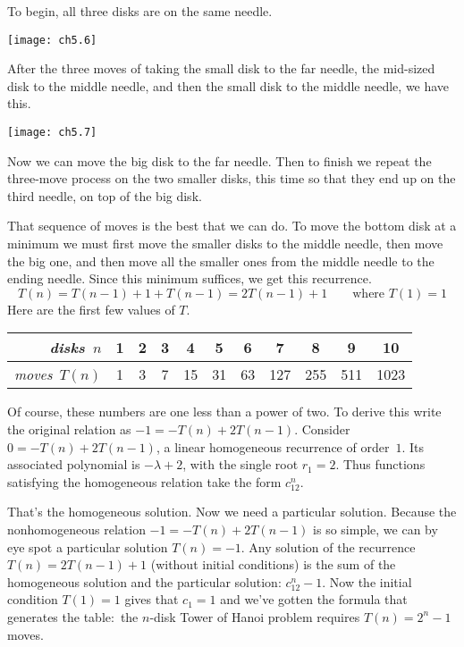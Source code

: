 To begin, all three disks are on the same needle.
\begin{center}
  \texttt{[image: ch5.6]}
\end{center}
After the three moves of taking the small disk to the far needle, 
the mid-sized disk to the
middle needle, and then the small disk to the middle needle,
we have this. 
\begin{center}
  \texttt{[image: ch5.7]}
\end{center}
Now we can  move the big disk to the far needle.
Then to finish we repeat the three-move process on the two smaller 
disks, this time so that they end up on the third needle, 
on top of the big disk.

That sequence of moves is the best that we can do.
To move the bottom disk
at a minimum we must first move the smaller disks to the middle needle, 
then move the big one,
and then move all the smaller ones from the middle needle 
to the ending needle. 
Since this minimum suffices, we get this recurrence.
\begin{equation*}
  T(n)=T(n-1)+1+T(n-1)=2T(n-1)+1 \qquad \text{where $T(1)=1$}
\end{equation*} 
Here are the first few values of $T$.
\begin{center}
  \begin{tabular}{r|cccccccccc}
    \textit{disks}~$n$             
       &1  &2  &3  &4  &5  &6     &7    &8    &9   &10  \\
    \hline
    \textit{moves}~$T(n)$ 
       &1  &3  &7  &15  &31  &63  &127  &255  &511 &1023 
  \end{tabular}
\end{center}
Of course, these numbers are one less than a power of two.
To derive this 
write the original relation as $-1=-T(n)+2T(n-1)$.
Consider $0=-T(n)+2T(n-1)$, a linear homogeneous recurrence of order~$1$. 
Its associated polynomial is $-\lambda+2$, 
with the single root $r_1=2$.
Thus
functions satisfying the homogeneous relation take the form $c_12^n$.

That's the homogeneous solution.
Now we need a particular solution. 
Because the nonhomogeneous relation $-1=-T(n)+2T(n-1)$ is so simple, 
we can by eye spot a particular solution $T(n)=-1$.
Any solution of the recurrence 
$T(n)=2T(n-1)+1$ (without initial conditions)
is the sum of the homogeneous solution and the
particular solution: $c_12^n-1$.
Now the initial condition $T(1)=1$ gives that $c_1=1$ and we've gotten
the formula that generates the table:~the $n$-disk Tower of Hanoi problem 
requires $T(n)=2^n-1$ moves.

